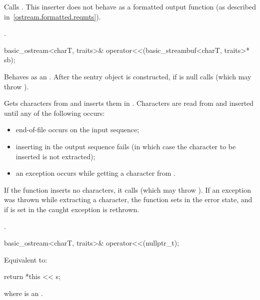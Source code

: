 \begin{itemdescr}
\pnum
\effects
Calls
.
This inserter does not
behave as a formatted output function (as described in~\ref{ostream.formatted.reqmts}).

\pnum
\returns
{}.
\end{itemdescr}

%
\begin{itemdecl}
basic_ostream<charT, traits>& operator<<(basic_streambuf<charT, traits>* sb);
\end{itemdecl}

\begin{itemdescr}
\pnum
\effects
Behaves as an .
After the sentry object is
constructed, if
 is null calls
(which may throw
).

\pnum
Gets characters from 
and inserts them in
.
Characters are read from 
and inserted until any of the following occurs:
\begin{itemize}
\item
end-of-file occurs on the input sequence;
\item
inserting in the output sequence fails
(in which case the character to be inserted is not extracted);
\item
an exception occurs while getting a character from .
\end{itemize}

\pnum
If the function inserts no characters, it calls
(which may throw
).
If an exception was thrown while extracting a character,
the function sets
in the error state, and if
is set in
the caught exception is rethrown.

\pnum
\returns
{}.
\end{itemdescr}

%
\begin{itemdecl}
basic_ostream<charT, traits>& operator<<(nullptr_t);
\end{itemdecl}

\begin{itemdescr}
\pnum
\effects
Equivalent to:
\begin{codeblock}
return *this << s;
\end{codeblock}
where  is an
.
\end{itemdescr}

